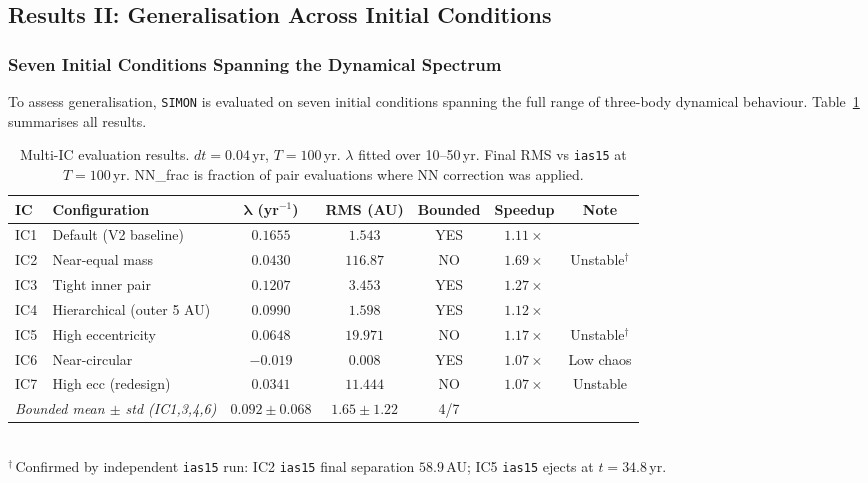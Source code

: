 \documentclass[12pt,a4paper]{article}
\newcommand{\simon}{\texttt{SIMON}}
\newcommand{\ias}{\texttt{ias15}}
\begin{document}
\subsection{Results II: Generalisation Across Initial Conditions}
\label{sec:results_gen}

\subsubsection{Seven Initial Conditions Spanning the Dynamical Spectrum}

To assess generalisation, \simon{} is evaluated on seven initial conditions spanning the full range of three-body dynamical behaviour. Table~\ref{tab:multi_ic} summarises all results.

\begin{table}[H]
\centering
\caption{Multi-IC evaluation results. $dt=0.04$\,yr, $T=100$\,yr. $\lambda$ fitted over 10--50\,yr. Final RMS vs \ias{} at $T=100$\,yr. NN\_frac is fraction of pair evaluations where NN correction was applied.}
\label{tab:multi_ic}
\begin{tabular}{llccccc}
\toprule
\textbf{IC} & \textbf{Configuration} & $\boldsymbol{\lambda}$ \textbf{(yr$^{-1}$)} & \textbf{RMS (AU)} & \textbf{Bounded} & \textbf{Speedup} & \textbf{Note} \\
\midrule
IC1 & Default (V2 baseline)     & $0.1655$ & $1.543$  & YES & $1.11\times$ & \\
IC2 & Near-equal mass           & $0.0430$ & $116.87$ & NO  & $1.69\times$ & Unstable$^\dagger$ \\
IC3 & Tight inner pair          & $0.1207$ & $3.453$  & YES & $1.27\times$ & \\
IC4 & Hierarchical (outer 5 AU) & $0.0990$ & $1.598$  & YES & $1.12\times$ & \\
IC5 & High eccentricity         & $0.0648$ & $19.971$ & NO  & $1.17\times$ & Unstable$^\dagger$ \\
IC6 & Near-circular             & $-0.019$ & $0.008$  & YES & $1.07\times$ & Low chaos \\
IC7 & High ecc (redesign)       & $0.0341$ & $11.444$ & NO  & $1.07\times$ & Unstable \\
\midrule
\multicolumn{2}{l}{\textit{Bounded mean $\pm$ std (IC1,3,4,6)}} & $0.092\pm0.068$ & $1.65\pm1.22$ & 4/7 & & \\
\bottomrule
\end{tabular}
\\[0.5em]
{\small $^\dagger$\,Confirmed by independent \ias{} run: IC2 \ias{} final separation $58.9$\,AU; IC5 \ias{} ejects at $t=34.8$\,yr.}
\end{table}
\end{document}
